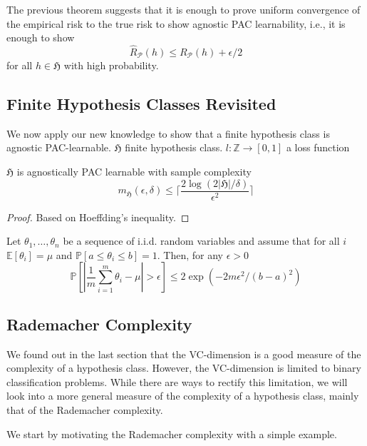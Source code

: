 The previous theorem suggests that it is enough to prove uniform convergence of
the empirical risk to the true risk to show agnostic PAC learnability, i.e., it
is enough to show
$$
\hat{R}_\mathcal{P}(h) \leq R_\mathcal{P}(h) + \epsilon/2
$$
for all $h \in \mathfrak{H}$ with high probability. 
\subsection{Finite Hypothesis Classes Revisited}
We now apply our new knowledge to show that a finite hypothesis class is
agnostic PAC-learnable. $\mathfrak{H}$ finite hypothesis class. $l: \mathbb{Z} \to [0,1]$ a
loss function 
	\begin{thm}
	$\mathfrak{H}$ is agnostically PAC learnable with sample complexity
	$$m_{\mathfrak{H}}(\epsilon, \delta) \leq \lceil \frac{2 \log (2
	|\mathfrak{H}|/ \delta)}{\epsilon^2} \rceil$$
\end{thm}
\begin{proof}
	Based on Hoeffding's inequality.
\end{proof}
\begin{thm}
	Let $\theta_1, \dots, \theta_n$ be a sequence of i.i.d. random variables
	and assume that for all $i$ $\mathbb{E}[\theta_i] = \mu$ and
	$\mathbb{P}[a \leq \theta_i \leq b]=1$. Then, for any $\epsilon > 0$
	$$
	\mathbb{P}[|\frac{1}{m} \sum_{i=1}^{m} \theta_i - \mu| > \epsilon] \leq 2 \exp(-2m\epsilon^2/(b-a)^2)
	$$ 	
\end{thm}
\subsection{Rademacher Complexity}
We found out in the last section that the VC-dimension is a good measure of the
complexity of a hypothesis class. However, the VC-dimension is limited to binary
classification problems. While there are ways to rectify this limitation, we
will look into 	 a more general measure of the complexity of a hypothesis class,
mainly that of the Rademacher complexity. 

We start by motivating the Rademacher complexity with a simple example. 

